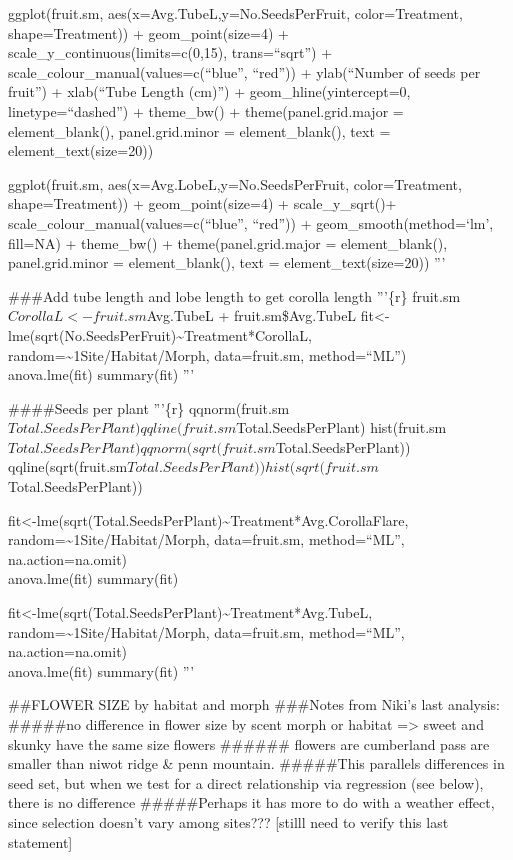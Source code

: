 \documentclass[]{article}
\begin{document}
ggplot(fruit.sm, aes(x=Avg.TubeL,y=No.SeedsPerFruit, color=Treatment,
shape=Treatment)) + geom\_point(size=4) +
scale\_y\_continuous(limits=c(0,15), trans=``sqrt'') +
scale\_colour\_manual(values=c(``blue'', ``red'')) + ylab(``Number of
seeds per fruit'') + xlab(``Tube Length (cm)'') +
geom\_hline(yintercept=0, linetype=``dashed'') + theme\_bw() +
theme(panel.grid.major = element\_blank(), panel.grid.minor =
element\_blank(), text = element\_text(size=20))

ggplot(fruit.sm, aes(x=Avg.LobeL,y=No.SeedsPerFruit, color=Treatment,
shape=Treatment)) + geom\_point(size=4) + scale\_y\_sqrt()+
scale\_colour\_manual(values=c(``blue'', ``red'')) +
geom\_smooth(method=`lm', fill=NA) + theme\_bw() +
theme(panel.grid.major = element\_blank(), panel.grid.minor =
element\_blank(), text = element\_text(size=20)) '''

\#\#\#Add tube length and lobe length to get corolla length '''\{r\}
fruit.sm\(CorollaL <- fruit.sm\)Avg.TubeL + fruit.sm\$Avg.TubeL
fit\textless{}-lme(sqrt(No.SeedsPerFruit)\textasciitilde{}Treatment*CorollaL,
random=\textasciitilde{}1\textbar{}Site/Habitat/Morph, data=fruit.sm,
method=``ML'')\\
anova.lme(fit) summary(fit) '''

\#\#\#\#Seeds per plant '''\{r\}
qqnorm(fruit.sm\(Total.SeedsPerPlant) qqline(fruit.sm\)Total.SeedsPerPlant)
hist(fruit.sm\(Total.SeedsPerPlant) qqnorm(sqrt(fruit.sm\)Total.SeedsPerPlant))
qqline(sqrt(fruit.sm\(Total.SeedsPerPlant)) hist(sqrt(fruit.sm\)Total.SeedsPerPlant))

fit\textless{}-lme(sqrt(Total.SeedsPerPlant)\textasciitilde{}Treatment*Avg.CorollaFlare,
random=\textasciitilde{}1\textbar{}Site/Habitat/Morph, data=fruit.sm,
method=``ML'', na.action=na.omit)\\
anova.lme(fit) summary(fit)

fit\textless{}-lme(sqrt(Total.SeedsPerPlant)\textasciitilde{}Treatment*Avg.TubeL,
random=\textasciitilde{}1\textbar{}Site/Habitat/Morph, data=fruit.sm,
method=``ML'', na.action=na.omit)\\
anova.lme(fit) summary(fit) '''

\#\#FLOWER SIZE by habitat and morph \#\#\#Notes from Niki's last
analysis: \#\#\#\#\#no difference in flower size by scent morph or
habitat =\textgreater{} sweet and skunky have the same size flowers
\#\#\#\#\#\# flowers are cumberland pass are smaller than niwot ridge \&
penn mountain. \#\#\#\#\#This parallels differences in seed set, but
when we test for a direct relationship via regression (see below), there
is no difference \#\#\#\#\#Perhaps it has more to do with a weather
effect, since selection doesn't vary among sites??? {[}stilll need to
verify this last statement{]}
\end{document}

